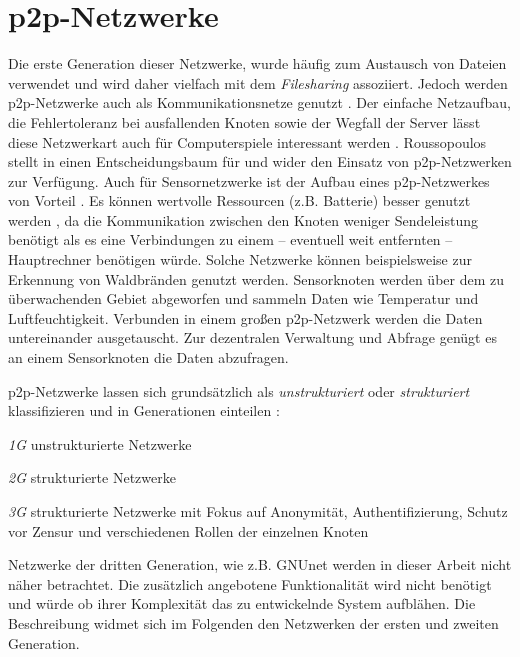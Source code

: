 \section{p2p-Netzwerke}
\label{chap:grundlagen:p2p}

Die erste Generation dieser Netzwerke, wurde häufig zum Austausch von Dateien verwendet und wird daher vielfach mit dem \emph{Filesharing} assoziiert. Jedoch werden p2p-Netzwerke auch als Kommunikationsnetze genutzt \cite{Darlagiannis2006Peertopeer}. Der einfache Netzaufbau, die Fehlertoleranz bei ausfallenden Knoten sowie der Wegfall der Server lässt diese Netzwerkart auch für Computerspiele interessant werden \cite{Knutsson2004Peertopeer, Triebel2008Peertopeer}. Roussopoulos stellt in \cite{Roussopoulos20032} einen Entscheidungsbaum für und wider den Einsatz von p2p-Netzwerken zur Verfügung. Auch für Sensornetzwerke ist der Aufbau eines p2p-Netzwerkes von Vorteil \cite{MuneebAliandKoenLangendoen2007Case}. Es können wertvolle Ressourcen (z.B. Batterie) besser genutzt werden \cite{Sioutas2009Building}, da die Kommunikation zwischen den Knoten weniger Sendeleistung benötigt als es eine Verbindungen zu einem -- eventuell weit entfernten -- Hauptrechner benötigen würde. Solche Netzwerke können beispielsweise zur Erkennung von Waldbränden genutzt werden. Sensorknoten werden über dem zu überwachenden Gebiet abgeworfen und sammeln Daten wie Temperatur und Luftfeuchtigkeit. Verbunden in einem großen p2p-Netzwerk werden die Daten untereinander ausgetauscht. Zur dezentralen Verwaltung und Abfrage genügt es an einem Sensorknoten die Daten abzufragen.

p2p-Netzwerke lassen sich grundsätzlich als \emph{unstrukturiert} oder \emph{strukturiert} klassifizieren \cite{Steinmetz2005, Lua2005Survey} und in Generationen einteilen \cite{Bo2003PeertoPeer}:
\begin{itemize*}
	\item \emph{1G} unstrukturierte Netzwerke
	\item \emph{2G} strukturierte Netzwerke
	\item \emph{3G} strukturierte Netzwerke mit Fokus auf Anonymität, Authentifizierung, Schutz vor Zensur und verschiedenen Rollen der einzelnen Knoten
\end{itemize*}

Netzwerke der dritten Generation, wie z.B. GNUnet \cite{Bennett2002GNet} werden in dieser Arbeit nicht näher betrachtet. Die zusätzlich angebotene Funktionalität wird nicht benötigt und würde ob ihrer Komplexität das zu entwickelnde System aufblähen. Die Beschreibung widmet sich im Folgenden den Netzwerken der ersten und zweiten Generation.

